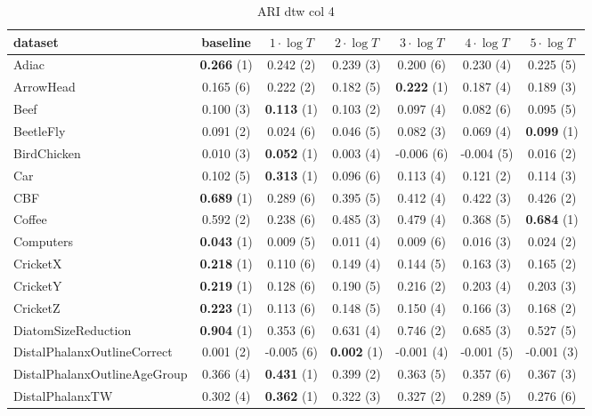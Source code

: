     \begin{table}[ht]
    \caption{ARI dtw col 4} 
    \begin{adjustbox}{width=\textwidth}
    \begin{tabular}{lcccccc}
    \hline
    dataset & baseline & \textbf{$1\cdot \log{T}$} & \textbf{$2\cdot \log{T}$} & \textbf{$3\cdot \log{T}$} & \textbf{$4\cdot \log{T}$} & \textbf{$5\cdot \log{T}$} \\ \hline
    Adiac & \textbf{0.266} (1) & 0.242 (2) & 0.239 (3) & 0.200 (6) & 0.230 (4) & 0.225 (5) \\
    ArrowHead & 0.165 (6) & 0.222 (2) & 0.182 (5) & \textbf{0.222} (1) & 0.187 (4) & 0.189 (3) \\
    Beef & 0.100 (3) & \textbf{0.113} (1) & 0.103 (2) & 0.097 (4) & 0.082 (6) & 0.095 (5) \\
    BeetleFly & 0.091 (2) & 0.024 (6) & 0.046 (5) & 0.082 (3) & 0.069 (4) & \textbf{0.099} (1) \\
    BirdChicken & 0.010 (3) & \textbf{0.052} (1) & 0.003 (4) & -0.006 (6) & -0.004 (5) & 0.016 (2) \\
    Car & 0.102 (5) & \textbf{0.313} (1) & 0.096 (6) & 0.113 (4) & 0.121 (2) & 0.114 (3) \\
    CBF & \textbf{0.689} (1) & 0.289 (6) & 0.395 (5) & 0.412 (4) & 0.422 (3) & 0.426 (2) \\
    Coffee & 0.592 (2) & 0.238 (6) & 0.485 (3) & 0.479 (4) & 0.368 (5) & \textbf{0.684} (1) \\
    Computers & \textbf{0.043} (1) & 0.009 (5) & 0.011 (4) & 0.009 (6) & 0.016 (3) & 0.024 (2) \\
    CricketX & \textbf{0.218} (1) & 0.110 (6) & 0.149 (4) & 0.144 (5) & 0.163 (3) & 0.165 (2) \\
    CricketY & \textbf{0.219} (1) & 0.128 (6) & 0.190 (5) & 0.216 (2) & 0.203 (4) & 0.203 (3) \\
    CricketZ & \textbf{0.223} (1) & 0.113 (6) & 0.148 (5) & 0.150 (4) & 0.166 (3) & 0.168 (2) \\
    DiatomSizeReduction & \textbf{0.904} (1) & 0.353 (6) & 0.631 (4) & 0.746 (2) & 0.685 (3) & 0.527 (5) \\
    DistalPhalanxOutlineCorrect & 0.001 (2) & -0.005 (6) & \textbf{0.002} (1) & -0.001 (4) & -0.001 (5) & -0.001 (3) \\
    DistalPhalanxOutlineAgeGroup & 0.366 (4) & \textbf{0.431} (1) & 0.399 (2) & 0.363 (5) & 0.357 (6) & 0.367 (3) \\
    DistalPhalanxTW & 0.302 (4) & \textbf{0.362} (1) & 0.322 (3) & 0.327 (2) & 0.289 (5) & 0.276 (6) \\

\end{tabular}
\end{adjustbox}
\end{table}
